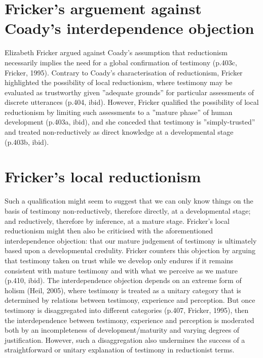 \documentclass[a4paper, 11pt]{article} %
\begin{document}
\section*{Fricker's arguement against Coady's interdependence objection}

Elizabeth Fricker argued against Coady's assumption that reductionism necessarily implies the need for a global confirmation of testimony (p.403c, Fricker, 1995)\cite{Fricker:1995}. Contrary to Coady's characterisation of reductionism, Fricker highlighted the possibility of local reductionism,  where testimony may be evaluated as trustworthy given ''adequate grounds'' for particular assessments of discrete utterances (p.404, ibid)\cite{Fricker:1995}. However, Fricker qualified the possibility of local reductionism by limiting such assessments to a ''mature phase'' of human development (p.403a, ibid)\cite{Fricker:1995}, and she conceded that testimony is ''simply-trusted'' and treated non-reductively as direct knowledge at a developmental stage (p.403b, ibid)\cite{Fricker:1995}.



\section*{Fricker's local reductionism}

Such a qualification might seem to suggest that we can only know things on the basis of testimony non-reductively, therefore directly, at a developmental stage; and reductively, therefore by inference, at a mature stage. Fricker's local reductionism might then also be criticised with the aforementioned interdependence objection: that our mature judgement of testimony is ultimately based upon a developmental credulity. Fricker counters this objection by arguing that testimony taken on trust while we develop only endures if it remains consistent with mature testimony and with what we perceive as we mature (p.410, ibid)\cite{Fricker:1995}. The interdependence objection depends on an extreme form of holism (Heil, 2005)\cite{Heil:2005}, where testimony is treated as a unitary category that is determined by relations between testimony, experience and perception. But once testimony is disaggregated into different categories (p.407, Fricker, 1995)\cite{Fricker:1995}, then the interdependence between testimony, experience and perception is moderated both by an incompleteness of development/maturity and varying degrees of justification. However, such a disaggregation also undermines the success of a straightforward or unitary explanation of testimony in reductionist terms.
\end{document}
